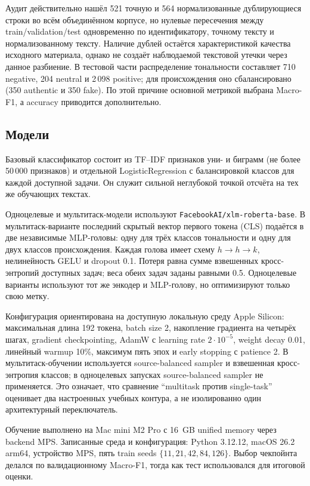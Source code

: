 \documentclass[11pt,a4paper]{article}
\newcommand{\repo}[1]{\nolinkurl{#1}}
\newcommand{\en}[1]{\foreignlanguage{english}{#1}}
\begin{document}
Аудит действительно нашёл 521 точную и 564 нормализованные дублирующиеся строки во всём объединённом корпусе, но нулевые пересечения между train/validation/test одновременно по идентификатору, точному тексту и нормализованному тексту. Наличие дублей остаётся характеристикой качества исходного материала, однако не создаёт наблюдаемой текстовой утечки через данное разбиение. В тестовой части распределение тональности составляет 710 negative, 204 neutral и 2\,098 positive; для происхождения оно сбалансировано (350 authentic и 350 fake). По этой причине основной метрикой выбрана Macro-F1, а accuracy приводится дополнительно.

\subsection{Модели}

Базовый классификатор состоит из TF--IDF признаков уни- и биграмм (не более 50\,000 признаков) и отдельной \en{LogisticRegression} с балансировкой классов для каждой доступной задачи. Он служит сильной неглубокой точкой отсчёта на тех же обучающих текстах.

Одноцелевые и мультитаск-модели используют \repo{FacebookAI/xlm-roberta-base}. В мультитаск-варианте последний скрытый вектор первого токена (CLS) подаётся в две независимые MLP-головы: одну для трёх классов тональности и одну для двух классов происхождения. Каждая голова имеет схему $h\rightarrow h\rightarrow k$, нелинейность GELU и dropout 0.1. Потеря равна сумме взвешенных кросс-энтропий доступных задач; веса обеих задач заданы равными 0.5. Одноцелевые варианты используют тот же энкодер и MLP-голову, но оптимизируют только свою метку.

Конфигурация ориентирована на доступную локальную среду Apple Silicon: максимальная длина 192 токена, batch size 2, накопление градиента на четырёх шагах, gradient checkpointing, AdamW с learning rate $2\cdot10^{-5}$, weight decay 0.01, линейный warmup 10\%, максимум пять эпох и early stopping с patience 2. В мультитаск-обучении используется source-balanced sampler и взвешенная кросс-энтропия классов; в одноцелевых запусках source-balanced sampler не применяется. Это означает, что сравнение ``multitask против single-task'' оценивает два настроенных учебных контура, а не изолированно один архитектурный переключатель.

Обучение выполнено на Mac mini M2 Pro с 16~GB unified memory через backend MPS. Записанные среда и конфигурация: Python 3.12.12, macOS 26.2 arm64, устройство MPS, пять train seeds $\{11,21,42,84,126\}$. Выбор чекпойнта делался по валидационному Macro-F1, тогда как тест использовался для итоговой оценки.
\end{document}
